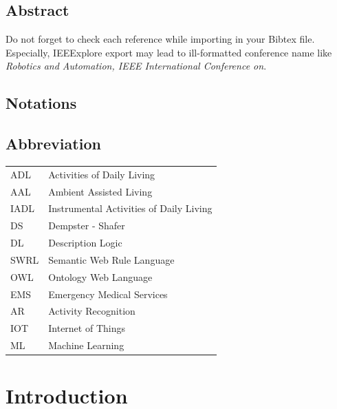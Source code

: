 \documentclass{thesisreport}
\begin{document}
  
 
\section*{Abstract}
   
 Do not forget to check each reference while importing in your Bibtex file.
 Especially, IEEExplore export may lead to ill-formatted conference name like \emph{Robotics and Automation, 
 IEEE International Conference on}.
 
 \newpage
 
 
\section*{Notations}
 
 \newpage
 
 \section*{Abbreviation}
 
 \begin{tabular}{p{2cm}p{12cm}}
 ADL & Activities of Daily Living\\
 AAL & Ambient Assisted Living \\
 IADL & Instrumental Activities of Daily Living \\
 DS & Dempster - Shafer \\
 DL & Description Logic \\
 SWRL & Semantic Web Rule Language\\
 OWL & Ontology Web Language\\
 EMS & Emergency Medical Services \\
 AR & Activity Recognition \\
 IOT & Internet of Things \\
 ML & Machine Learning \\
 \end{tabular}
 
 \newpage
 
 \listoffigures
 
 \listoftables
 
 \tableofcontents
 
 
 \chapter{Introduction}
\end{document}
